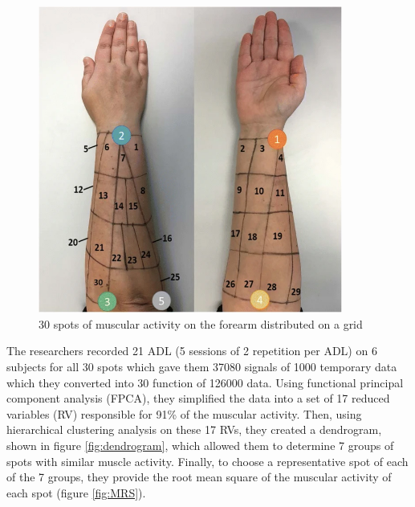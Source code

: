 \documentclass{article}
\begin{document}
\begin{figure}[H]
    \centering
    \includegraphics[width=10cm]{images/forearmActivityZones.png}
    \caption{30 spots of muscular activity on the forearm distributed on a grid \cite{ref:identifiedEMGlocation}}
    \label{fig:forearmActivityZones}
\end{figure}

The researchers recorded 21 ADL (5 sessions of 2 repetition per ADL) on 6 subjects for all 30 spots which gave them 37080 signals of 1000 temporary data which they converted into 30 function of 126000 data. Using functional principal component analysis (FPCA), they simplified the data into a set of 17 reduced variables (RV) responsible for 91\% of the muscular activity. Then, using hierarchical clustering analysis on these 17 RVs, they created a dendrogram, shown in figure \ref{fig:dendrogram}, which allowed them to determine 7 groups of spots with similar muscle activity. Finally, to choose a representative spot of each of the 7 groups, they provide the root mean square of the muscular activity of each spot (figure \ref{fig:MRS}).
\end{document}
